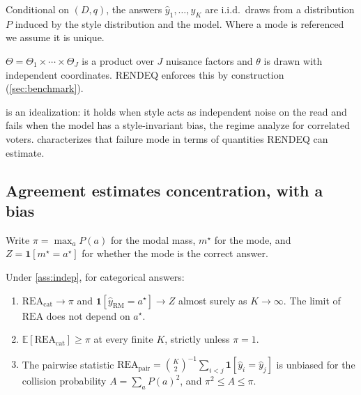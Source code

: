 \documentclass[11pt]{article}
\newcommand{\rea}{\mathrm{REA}}
\newcommand{\rmg}{\mathrm{RM}}
\begin{document}
\begin{assumption}
\label{ass:indep}
Conditional on $(D,q)$, the answers $\hat y_1,\dots,\hat y_K$ are i.i.d.\ draws from a distribution $P$ induced by the style distribution and the model. Where a mode is referenced we assume it is unique.
\end{assumption}

\begin{assumption}
\label{ass:factored}
$\Theta = \Theta_1 \times \cdots \times \Theta_J$ is a product over $J$ nuisance factors and $\theta$ is drawn with independent coordinates. RENDEQ enforces this by construction (\cref{sec:benchmark}).
\end{assumption}

 is an idealization: it holds when style acts as independent noise on the read and fails when the model has a style-invariant bias, the regime \citet{estornell2024debate} analyze for correlated voters.  characterizes that failure mode in terms of quantities RENDEQ can estimate.

\subsection{Agreement estimates concentration, with a bias}
\label{sec:concentration}

Write $\pi = \max_a P(a)$ for the modal mass, $m^\star$ for the mode, and $Z = \mathbf{1}[m^\star = a^\star]$ for whether the mode is the correct answer.

\begin{proposition}[What $\rea$ estimates]
\label{prop:concentration}
Under \cref{ass:indep}, for categorical answers:
\begin{enumerate}[label=(\roman*)]
\itemsep0em
\item $\rea_{\text{cat}} \to \pi$ and $\mathbf{1}[\hat y_{\rmg} = a^\star] \to Z$ almost surely as $K\to\infty$. The limit of $\rea$ does not depend on $a^\star$.
\item $\mathbb{E}[\rea_{\text{cat}}] \ge \pi$ at every finite $K$, strictly unless $\pi = 1$.
\item The pairwise statistic $\rea_{\text{pair}} = \binom{K}{2}^{-1}\sum_{i<j}\mathbf{1}[\hat y_i = \hat y_j]$ is unbiased for the collision probability $A = \sum_a P(a)^2$, and $\pi^2 \le A \le \pi$.
\end{enumerate}
\end{proposition}
\end{document}
